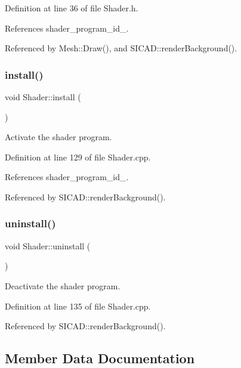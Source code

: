 Definition at line 36 of file Shader.\+h.



References shader\+\_\+program\+\_\+id\+\_\+.



Referenced by Mesh\+::\+Draw(), and S\+I\+C\+A\+D\+::render\+Background().

\mbox{\label{classShader_a8e53260be208ebf6c804a0d309e74097}} 
\subsubsection{\texorpdfstring{install()}{install()}}
{\footnotesize\ttfamily void Shader\+::install (\begin{DoxyParamCaption}{ }\end{DoxyParamCaption})}



Activate the shader program. 



Definition at line 129 of file Shader.\+cpp.



References shader\+\_\+program\+\_\+id\+\_\+.



Referenced by S\+I\+C\+A\+D\+::render\+Background().

\mbox{\label{classShader_afa6fb33b37c9385cf62a836092da570b}} 
\subsubsection{\texorpdfstring{uninstall()}{uninstall()}}
{\footnotesize\ttfamily void Shader\+::uninstall (\begin{DoxyParamCaption}{ }\end{DoxyParamCaption})}



Deactivate the shader program. 



Definition at line 135 of file Shader.\+cpp.



Referenced by S\+I\+C\+A\+D\+::render\+Background().



\subsection{Member Data Documentation}
\mbox{\label{classShader_ab1d32c11e4114a95b484f819b950af5d}} 
